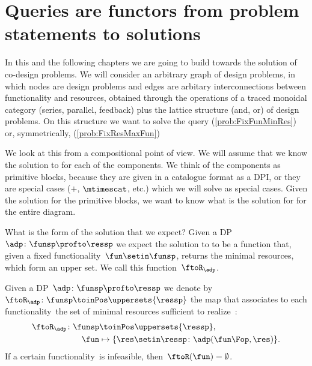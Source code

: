 \section{Queries are functors from problem statements to solutions}

In this and the following chapters we are going to build towards the solution of co-design problems.
We will consider an arbitrary graph of design problems, in which nodes are design problems and edges are arbitary interconnections between functionality and resources, obtained through the operations of a traced monoidal category (series, parallel, feedback) plus the lattice structure (and, or) of design problems.
On this structure we want to solve the query \FixFunMinRes (\cref{prob:FixFunMinRes}) or, symmetrically, \FixResMaxFun (\cref{prob:FixResMaxFun})

We look at this from a compositional point of view.
We will assume that we know the solution to \FixFunMinRes for each of the components.
We think of the components as primitive blocks, because they are given in a catalogue format as a DPI, or they are special cases ($+$, $\mtimescat$, etc.) which we will solve as special cases.
Given the solution for the primitive blocks, we want to know what is the solution for \FixFunMinRes for the entire diagram.

What is the form of the solution that we expect?
Given a DP~$\adp\colon \funsp \profto \ressp$ we expect the solution to \FixFunMinRes to be a function that, given a fixed functionality~$\fun\setin\funsp$, returns the minimal resources, which form an upper set.
We call this function~$\ftoR_\adp$.

\begin{definition}
    \label{def:ftoR-dp}
    Given a DP~$\adp\colon\funsp\profto\ressp$ we denote by~$\ftoR_{\adp}\colon \funsp\toinPos \uppersets{\ressp}$ the map that associates to each functionality~\fun the set of minimal resources sufficient to realize~\fun:
    \begin{equation*}
        \begin{aligned}
            \ftoR_{\adp}\colon \funsp & \toinPos \uppersets{\ressp}, \\
            \fun                      & \mapsto \{ \res \setin \ressp \colon \adp(\fun\Fop, \res)\}.
        \end{aligned}
    \end{equation*}
    If a certain functionality~\fun is infeasible, then~$\ftoR(\fun)=\emptyset$.
\end{definition}

